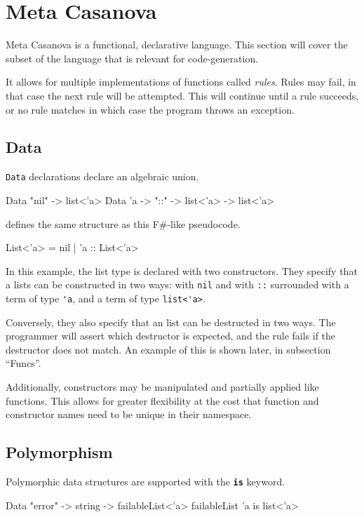 \section{Meta Casanova}
Meta Casanova is a functional, declarative language.
This section will cover the subset of the language that is relevant for code-generation.

It allows for multiple implementations of functions called \textit{rules}.
Rules may fail, in that case the next rule will be attempted.
This will continue until a rule succeeds, or no rule matches in which case the program throws an exception.

\subsection{Data}
\texttt{Data} declarations declare an algebraic union\cite{algebraic_datastructures}.

\begin{code}
Data "nil" -> list<'a>
Data 'a -> "::" -> list<'a> -> list<'a>
\end{code}

defines the same structure as this F\#-like pseudocode.

\begin{code}
List<'a> = nil 
         | 'a :: List<'a>
\end{code}

In this example, the list type is declared with two constructors.
They specify that a lists can be constructed in two ways: with \verb|nil| and with \verb|::| surrounded with a term of type \verb|'a|, and a term of type \verb|list<'a>|.

Conversely, they also specify that an list can be destructed in two ways.
The programmer will assert which destructor is expected, and the rule fails if the destructor does not match.
An example of this is shown later, in subsection ``Funcs''.

Additionally, constructors may be manipulated and partially applied like functions.
This allows for greater flexibility at the cost that function and constructor names need to be unique in their namespace.

\subsection{Polymorphism}
Polymorphic data structures are supported with the \textbf{\texttt{is}} keyword.

\begin{code}
Data "error" -> string -> failableList<'a>
failableList 'a is list<'a>
\end{code}

